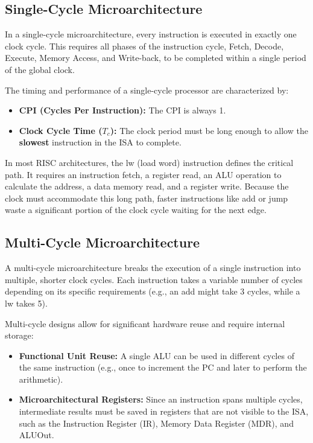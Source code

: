 \subsection{Single-Cycle Microarchitecture}

\begin{definition}
In a single-cycle microarchitecture, every instruction is executed in exactly one clock cycle. This requires all phases of the instruction cycle, Fetch, Decode, Execute, Memory Access, and Write-back, to be completed within a single period of the global clock.
\end{definition}

\begin{important}
The timing and performance of a single-cycle processor are characterized by:
\begin{itemize}
    \item \textbf{CPI (Cycles Per Instruction):} The CPI is always 1.
    \item \textbf{Clock Cycle Time ($T_c$):} The clock period must be long enough to allow the \textbf{slowest} instruction in the ISA to complete. 
\end{itemize}
\end{important}

\begin{remark}
In most RISC architectures, the lw (load word) instruction defines the critical path. It requires an instruction fetch, a register read, an ALU operation to calculate the address, a data memory read, and a register write. Because the clock must accommodate this long path, faster instructions like add or jump waste a significant portion of the clock cycle waiting for the next edge.
\end{remark}

\subsection{Multi-Cycle Microarchitecture}

\begin{definition}
A multi-cycle microarchitecture breaks the execution of a single instruction into multiple, shorter clock cycles. Each instruction takes a variable number of cycles depending on its specific requirements (e.g., an add might take 3 cycles, while a lw takes 5).
\end{definition}

\begin{important}
Multi-cycle designs allow for significant hardware reuse and require internal storage:
\begin{itemize}
    \item \textbf{Functional Unit Reuse:} A single ALU can be used in different cycles of the same instruction (e.g., once to increment the PC and later to perform the arithmetic).
    \item \textbf{Microarchitectural Registers:} Since an instruction spans multiple cycles, intermediate results must be saved in registers that are not visible to the ISA, such as the Instruction Register (IR), Memory Data Register (MDR), and ALUOut.
\end{itemize}
\end{important}

